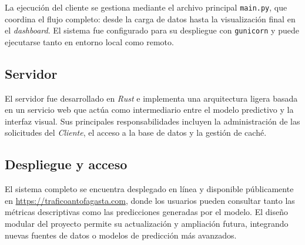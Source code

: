 \documentclass[12pt]{article}
\begin{document}
La ejecución del cliente se gestiona mediante el archivo principal \texttt{main.py}, que coordina el flujo completo: desde la carga de datos hasta la visualización final en el \textit{dashboard}.
El sistema fue configurado para su despliegue con \texttt{gunicorn} y puede ejecutarse tanto en entorno local como remoto.

\subsection*{Servidor}

El servidor fue desarrollado en \textit{Rust} e implementa una arquitectura ligera basada en un servicio web que actúa como intermediario entre el modelo predictivo y la interfaz visual.
Sus principales responsabilidades incluyen la administración de las solicitudes del \textit{Cliente}, el acceso a la base de datos y la gestión de caché.

\subsection*{Despliegue y acceso}

El sistema completo se encuentra desplegado en línea y disponible públicamente en \url{https://traficoantofagasta.com}, donde los usuarios pueden consultar tanto las métricas descriptivas como las predicciones generadas por el modelo.
El diseño modular del proyecto permite su actualización y ampliación futura, integrando nuevas fuentes de datos o modelos de predicción más avanzados.

\newpage
\end{document}
